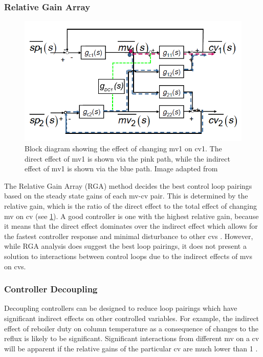 \subsubsection{Relative Gain Array}

\begin{figure}
    \vspace{-\intextsep}
    \centering
    \includegraphics[width=\linewidth]{chapters/4-operation-control/4-Figures/RGA-Thornhill-2013.png}
    \caption{Block diagram showing the effect of changing mv1 on cv1. The direct effect of mv1 is shown via the pink path, while the indirect effect of mv1 is shown via the blue path. Image adapted from \textcite{thornhill_process_2009}}
    \label{fig:RGA-block-di}
\end{figure}

The Relative Gain Array (RGA) method decides the best control loop pairings based on the steady state gains of each mv-cv pair. This is determined by the relative gain, which is the ratio of the direct effect to the total effect of changing mv on cv (see \cref{fig:RGA-block-di}). A good controller is one with the highest relative gain, because it means that the direct effect dominates over the indirect effect which allows for the fastest controller response and minimal disturbance to other cvs \cite{seborg_process_2011}. However, while RGA analysis does suggest the best loop pairings, it does not present a solution to interactions between control loops due to the indirect effects of mvs on cvs.

\subsubsection{Controller Decoupling}
Decoupling controllers can be designed to reduce loop pairings which have significant indirect effects on other controlled variables. For example, the indirect effect of reboiler duty on column temperature as a consequence of changes to the reflux is likely to be significant. Significant interactions from different mv on a cv will be apparent if the relative gains of the particular cv are much lower than 1 \cite{lim_121_2020}. 

